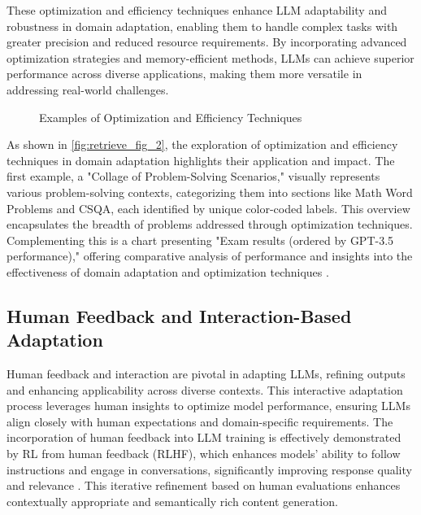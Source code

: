 These optimization and efficiency techniques enhance LLM adaptability and robustness in domain adaptation, enabling them to handle complex tasks with greater precision and reduced resource requirements. By incorporating advanced optimization strategies and memory-efficient methods, LLMs can achieve superior performance across diverse applications, making them more versatile in addressing real-world challenges.

\begin{figure}[ht!]
\centering
{}\hspace{0.03\textwidth}
\hspace{0.03\textwidth}
\caption{Examples of Optimization and Efficiency Techniques}\label{fig:retrieve_fig_2}
\end{figure}

As shown in \autoref{fig:retrieve_fig_2}, the exploration of optimization and efficiency techniques in domain adaptation highlights their application and impact. The first example, a "Collage of Problem-Solving Scenarios," visually represents various problem-solving contexts, categorizing them into sections like Math Word Problems and CSQA, each identified by unique color-coded labels. This overview encapsulates the breadth of problems addressed through optimization techniques. Complementing this is a chart presenting "Exam results (ordered by GPT-3.5 performance)," offering comparative analysis of performance and insights into the effectiveness of domain adaptation and optimization techniques \cite{wei2022chain,GPT-4Techn0}.

\subsection{Human Feedback and Interaction-Based Adaptation} \label{subsec:Human Feedback and Interaction-Based Adaptation}

Human feedback and interaction are pivotal in adapting LLMs, refining outputs and enhancing applicability across diverse contexts. This interactive adaptation process leverages human insights to optimize model performance, ensuring LLMs align closely with human expectations and domain-specific requirements. The incorporation of human feedback into LLM training is effectively demonstrated by RL from human feedback (RLHF), which enhances models' ability to follow instructions and engage in conversations, significantly improving response quality and relevance \cite{JudgingLLM2,GPT-4Techn0}. This iterative refinement based on human evaluations enhances contextually appropriate and semantically rich content generation.

